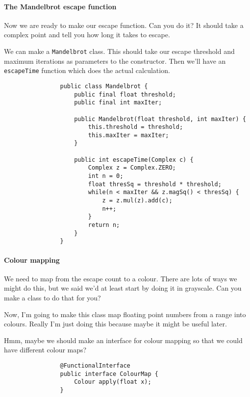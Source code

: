 \documentclass{article}
\begin{document}
        \paragraph{The Mandelbrot escape function}
            Now we are ready to make our escape function. Can you do it? It should take a complex point and tell you how long it takes to
            escape.
            
            We can make a \texttt{Mandelbrot} class. This should take our escape threshold and maximum iterations as parameters to
            the constructor. Then we'll have an \texttt{escapeTime} function which does the actual calculation.
            
            \begin{verbatim}
                public class Mandelbrot {
                    public final float threshold;
                    public final int maxIter;
                    
                    public Mandelbrot(float threshold, int maxIter) {
                        this.threshold = threshold;
                        this.maxIter = maxIter;
                    }
            
                    public int escapeTime(Complex c) {
                        Complex z = Complex.ZERO;
                        int n = 0;
                        float thresSq = threshold * threshold;
                        while(n < maxIter && z.magSq() < thresSq) {
                            z = z.mul(z).add(c); 
                            n++;
                        }
                        return n;
                    }
                }
            \end{verbatim}
        
        \newpage
        \paragraph{Colour mapping}
            We need to map from the escape count to a colour. There are lots of ways we might do this, but we said we'd at least start by
            doing it in grayscale.  Can you make a class to do that for you?
            
            Now, I'm going to make this class map floating point numbers from a range into colours. Really I'm just doing this because
            maybe it might be useful later. 
            
            Hmm, maybe we should make an interface for colour mapping so that we could have different colour maps?
            \begin{verbatim}
                @FunctionalInterface
                public interface ColourMap {
                    Colour apply(float x);
                }
            \end{verbatim}
            
\end{document}

